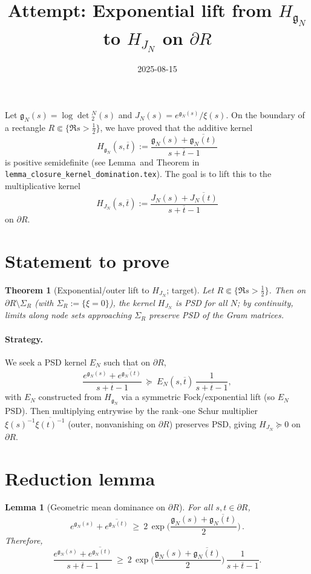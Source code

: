 \documentclass[11pt]{article}
\title{Attempt: Exponential lift from $H_{\mathfrak g_N}$ to $H_{J_N}$ on $\partial R$}
\date{2025-08-15}
\newtheorem{theorem}{Theorem}
\newtheorem{lemma}{Lemma}
\theoremstyle{remark}
\begin{document}
\maketitle

Let $\mathfrak g_N(s)=\log\det{}_2^N(s)$ and $J_N(s)=e^{\mathfrak g_N(s)}/\xi(s)$. On the boundary of a rectangle $R\Subset\{\Re s>\tfrac12\}$, we have proved that the additive kernel
\[H_{\mathfrak g_N}(s,\overline t):=\frac{\mathfrak g_N(s)+\overline{\mathfrak g_N(t)}}{s+\overline t-1}\]
is positive semidefinite (see Lemma~and Theorem in \texttt{lemma\_closure\_kernel\_domination.tex}). The goal is to lift this to the multiplicative kernel
\[H_{J_N}(s,\overline t):=\frac{J_N(s)+\overline{J_N(t)}}{s+\overline t-1}\]
on $\partial R$.

\section*{Statement to prove}
\begin{theorem}[Exponential/outer lift to $H_{J_N}$; target]
Let $R\Subset\{\Re s>\tfrac12\}$. Then on $\partial R\setminus\Sigma_R$ (with $\Sigma_R:=\{\xi=0\}$), the kernel $H_{J_N}$ is PSD for all $N$; by continuity, limits along node sets approaching $\Sigma_R$ preserve PSD of the Gram matrices.
\end{theorem}

\paragraph{Strategy.} We seek a PSD kernel $E_N$ such that on $\partial R$,
\begin{equation}\label{eq:exp-factor}
\frac{e^{\mathfrak g_N(s)}+\overline{e^{\mathfrak g_N(t)}}}{s+\overline t-1}\ \succeq\ E_N(s,\overline t)\,\frac{1}{s+\overline t-1},
\end{equation}
with $E_N$ constructed from $H_{\mathfrak g_N}$ via a symmetric Fock/exponential lift (so $E_N$ PSD). Then multiplying entrywise by the rank--one Schur multiplier $\xi(s)^{-1}\overline{\xi(t)^{-1}}$ (outer, nonvanishing on $\partial R$) preserves PSD, giving $H_{J_N}\succeq0$ on $\partial R$.

\section*{Reduction lemma}
\begin{lemma}[Geometric mean dominance on $\partial R$]
For all $s,t\in\partial R$,
\[e^{\mathfrak g_N(s)}+\overline{e^{\mathfrak g_N(t)}}\ \ge\ 2\,\exp\Big(\frac{\mathfrak g_N(s)+\overline{\mathfrak g_N(t)}}{2}\Big)\,.
\]
Therefore,
\[\frac{e^{\mathfrak g_N(s)}+\overline{e^{\mathfrak g_N(t)}}}{s+\overline t-1}\ \ge\ 2\,\exp\Big(\frac{\mathfrak g_N(s)+\overline{\mathfrak g_N(t)}}{2}\Big)\,\frac{1}{s+\overline t-1}.
\]
\end{lemma}
\end{document}
